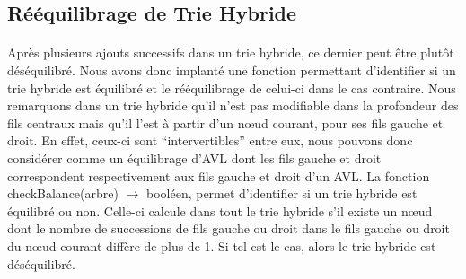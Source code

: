 \documentclass[a4paper,12pt]{report}
\begin{document}
\subsection{Rééquilibrage de Trie Hybride}
\paragraph{}
Après plusieurs ajouts successifs dans un trie hybride, ce dernier peut être plutôt déséquilibré. Nous avons donc implanté
une fonction permettant d'identifier si un trie hybride est équilibré et le rééquilibrage de celui-ci dans le cas contraire.
Nous remarquons dans un trie hybride qu'il n'est pas modifiable dans la profondeur des fils centraux mais qu'il l'est à
partir d'un nœud courant, pour ses fils gauche et droit. En effet, ceux-ci sont ``intervertibles'' entre eux, nous pouvons donc
considérer comme un équilibrage d'AVL dont les fils gauche et droit correspondent respectivement aux fils gauche et droit d'un AVL.
La fonction checkBalance(arbre) $\rightarrow$ booléen, permet d'identifier si un trie hybride est équilibré ou non. Celle-ci
calcule dans tout le trie hybride s'il existe un nœud dont le nombre de successions de fils gauche ou droit dans le fils gauche ou 
droit du nœud courant diffère de plus de 1. Si tel est le cas, alors le trie hybride est déséquilibré.
\end{document}
